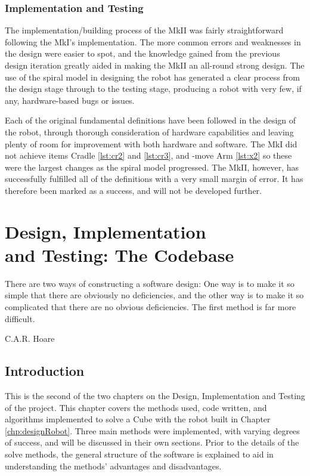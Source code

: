 \documentclass{report}
\newcommand{\move}[1]{\uppercase{\texttt{\formatmovesnospace{#1}}}-move}
\begin{document}
    \subsection{Implementation and Testing}
    
	The implementation/building process of the MkII was fairly straightforward following the MkI's implementation. The more common errors and weaknesses in the design were easier to spot, and the knowledge gained from the previous design iteration greatly aided in making the MkII an all-round strong design. The use of the spiral model in designing the robot has generated a clear process from the design stage through to the testing stage, producing a robot with very few, if any, hardware-based bugs or issues.
	
	Each of the original fundamental definitions have been followed in the design of the robot, through thorough consideration of hardware capabilities and leaving plenty of room for improvement with both hardware and software. The MkI did not achieve items Cradle \ref{lst:cr2} and \ref{lst:cr3}, and \move{x} Arm \ref{lst:x2} so these were the largest changes as the spiral model progressed. The MkII, however, has successfully fulfilled all of the definitions with a very small margin of error. It has therefore been marked as a success, and will not be developed further.
    
    \newpage
    
    \chapter[Design, Implementation and Testing: The Codebase]{Design, Implementation \\ and Testing: The Codebase}
    \epigraph{There are two ways of constructing a software design: One way is to make it so simple that there are obviously no deficiencies, and the other way is to make it so complicated that there are no obvious deficiencies. The first method is far more difficult.}{C.A.R. Hoare \cite{Hoare1981}}
    
    \section{Introduction}
    
	This is the second of the two chapters on the Design, Implementation and Testing of the project. This chapter covers the methods used, code written, and algorithms implemented to solve a Cube with the robot built in Chapter \ref{chp:designRobot}. Three main methods were implemented, with varying degrees of success, and will be discussed in their own sections. Prior to the details of the solve methods, the general structure of the software is explained to aid in understanding the methods' advantages and disadvantages.
    
\end{document}

